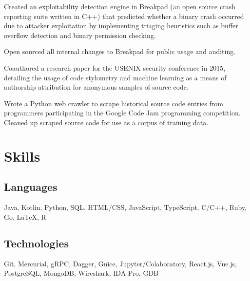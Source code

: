 \documentclass[]{template}
\begin{document}
\sectionsep

\hfill
{}
\begin{tightemize}
\item
  Created an exploitability detection engine in Breakpad (an open source crash
  reporting suite written in C++) that predicted whether a binary
  crash occurred due to attacker exploitation by implementing triaging heuristics
  such as buffer overflow detection and binary permission checking.
\item
  Open sourced all internal changes to Breakpad for public usage and auditing.
\end{tightemize}

\sectionsep

\hfill
{}
\begin{tightemize}
\item
  Coauthored a research paper for the USENIX security conference in 2015,
  detailing the usage of code stylometry and machine learning as a means of
  authorship attribution for anonymous samples of source code.
\item
  Wrote a Python web crawler to scrape historical source code entries from
  programmers participating in the Google Code Jam programming competition.
  Cleaned up scraped source code for use as a corpus of training data.
\end{tightemize}

\section{Skills}

\subsection{Languages}
Java,
Kotlin,
Python,
SQL,
HTML/CSS,
JavaScript,
TypeScript,
C/C++,
Ruby,
Go,
\LaTeX,
R

\sectionsep

\subsection{Technologies}
Git,
Mercurial,
gRPC,
Dagger,
Guice,
Jupyter/Colaboratory,
React.js,
Vue.js,
PostgreSQL,
MongoDB,
Wireshark,
IDA Pro,
GDB

\lastupdated
\end{document}
